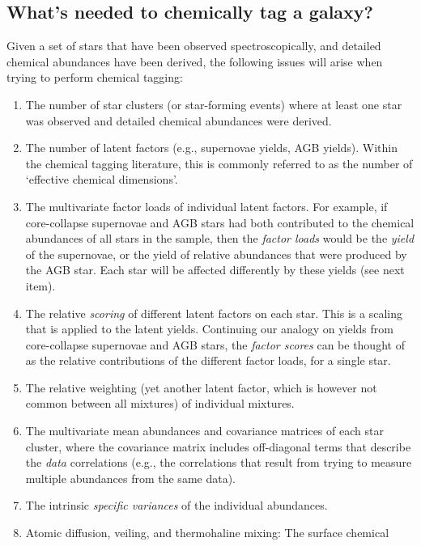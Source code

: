 \documentclass{aastex61}
\begin{document}
\subsection{What's needed to chemically tag a galaxy?}
\label{section:the-problem}

Given a set of stars that have been observed spectroscopically, and detailed
chemical abundances have been derived, the following issues will arise when
trying to perform chemical tagging:

\begin{enumerate}
\item The number of star clusters (or star-forming events) where at least one
      star was observed and detailed chemical abundances were derived.
\item The number of latent factors (e.g., supernovae yields, AGB yields).
      Within the chemical tagging literature, this is commonly referred to as
      the number of `effective chemical dimensions'.
\item The multivariate factor loads of individual latent factors. For example,
      if core-collapse supernovae and AGB stars had both contributed to the
      chemical abundances of all stars in the sample, then the
      \emph{factor loads} would be the \emph{yield} of the supernovae, or the
      yield of relative abundances that were produced by the AGB star. Each
      star will be affected differently by these yields (see next item).
\item The relative \emph{scoring} of different latent factors on each star.
      This is a scaling that is applied to the latent yields. Continuing our
      analogy on yields from core-collapse supernovae and AGB stars, the
      \emph{factor scores} can be thought of as the relative contributions of
      the different factor loads, for a single star.
\item The relative weighting (yet another latent factor, which is however not
      common between all mixtures) of individual mixtures.
\item The multivariate mean abundances and covariance matrices of each star
      cluster, where the covariance matrix includes off-diagonal terms that
      describe the \emph{data} correlations (e.g., the correlations that result
      from trying to measure multiple abundances from the same data).
\item The intrinsic \emph{specific variances} of the individual abundances.
\item Atomic diffusion, veiling, and thermohaline mixing: The surface chemical

\end{enumerate}
\end{document}
